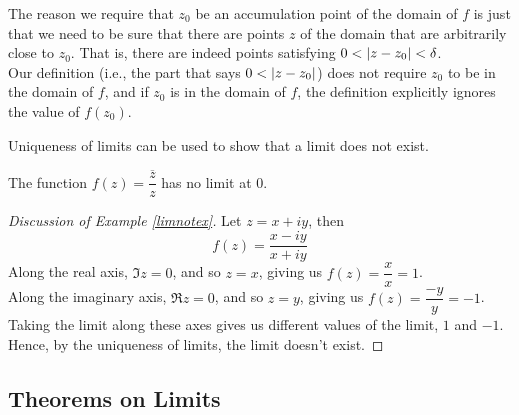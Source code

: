 \medskip

\begin{remark}
The reason we require that $z_0$ be an accumulation point of the domain of $f$ is just that we need to be sure that there are points $z$ of the domain that are arbitrarily close to $z_0$. That is, there are indeed points satisfying $0< \left\lvert z-z_0\right\rvert < \delta$.\\[0.5em]
Our definition (i.e., the part that says $0 < \left\lvert z - z_0\right\rvert$) does not require $z_0$ to be in the domain of $f$, and if $z_0$ is in the domain of $f$, the definition explicitly ignores the value of $f(z_0)$.
\end{remark}

\medskip

Uniqueness of limits can be used to show that a limit does not exist.
\begin{example}\label{limnotex}
The function $f(z) = \dfrac{\overline{z}}{z}$ has no limit at $0$.
\end{example}
\begin{proof}[Discussion of Example \ref{limnotex}]
Let $z = x + iy$, then
\[f(z) = \frac{x - iy}{x + iy}\]
Along the real axis, $\Im z = 0$, and so $z = x$, giving us $f(z) = \dfrac{x}{x} = 1$.\\[0.5em]
Along the imaginary axis, $\Re z = 0$, and so $z = y$, giving us $f(z) = \dfrac{-y}{y} = -1$.\\[0.5em]
Taking the limit along these axes gives us different values of the limit, $1$ and $-1$. Hence, by the uniqueness of limits, the limit doesn't exist.
\end{proof}

\bigskip

\subsection{Theorems on Limits}

